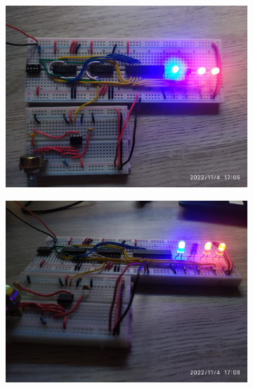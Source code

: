 \documentclass[12pt, oneside]{article}
\begin{document}
\begin{figure}[h!]
    \begin{subfigure}{0.45\textwidth}
        \centering
        \includegraphics[width=\linewidth]{figs/IMG_20221104_170641.jpg}
    \end{subfigure}
    \begin{subfigure}{0.45\textwidth}
        \centering
        \includegraphics[width=\linewidth]{figs/IMG_20221104_170809.jpg}
    \end{subfigure}
    \begin{subfigure}{0.45\textwidth}
        \centering

\end{subfigure}
\end{figure}
\end{document}
